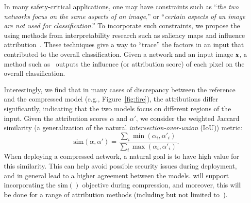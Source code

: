 In many safety-critical
applications,
  one may have constraints  
  such as
  ``{\sl the two networks focus on the same aspects of an image},'' or 
  ``{\sl certain aspects of an image are not used for classification}.''  To incorporate such constraints, we propose the using methods from interpretability research such as saliency maps and influence attribution~\cite{SimonyanVZ13,fergus2013Visualizing,Kim2018Interpretability,Mukund2017Axiomatic}.
  These techniques give a way to ``trace'' the factors in an input that contributed to the overall classification.  Given a network and an input image ${\bf x}$, a method such as~\cite{Mukund2017Axiomatic,Kim2018Interpretability} outputs the influence (or attribution score) of each pixel on the overall classification.

Interestingly, we find that in many cases of discrepancy between the reference and the compressed model (e.g., Figure~\ref{fig:fire}), the attributions differ significantly, indicating that the two models focus on different regions of the input.  Given the attribution scores $\alpha$ and $\alpha'$, we consider the weighted Jaccard similarity (a generalization of the natural {\em intersection-over-union} (IoU)) metric:%
\[ \text{sim}(\alpha, \alpha') = \frac{ \sum_i \min( \alpha_i, \alpha'_i )}{\sum_i \max (\alpha_i, \alpha'_i) }. \]
When deploying a compressed network, a natural goal is to have high value for this similarity.  This can help avoid possible security issues during deployment,
 and in general lead to a higher agreement between the models.
\label{fse-metric}
\algoName will support incorporating the $\text{sim}()$ objective during compression, and moreover, this will be done for a range of attribution methods (including but not limited to~\cite{SimonyanVZ13,Mukund2017Axiomatic,ancona2018towards}).